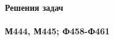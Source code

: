 



% 
    \pagestyle{fancy} %
    \fancyhead{} %
    \fancyfoot{} %
    \fancyfoot[L]{\textbf{\thepage}} %
    \setcounter{page}{34} %
    \setcounter{figure}{4} %
    

    \begin{paracol}{2}
        \begin{column}
        \end{column}
        
        \begin{column}
            \noindent\textbf{\LARGE{Решения задач}}\\
            \\
            \textbf{\large{М444, М445; Ф458-Ф461}}
        \end{column}
    \end{paracol} 


